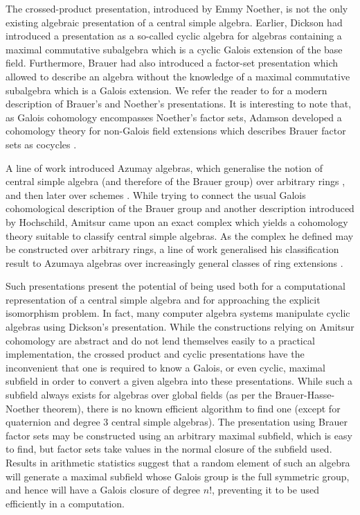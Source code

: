 The crossed-product presentation, introduced by Emmy Noether, is not the only existing algebraic presentation of a central simple algebra. Earlier, Dickson had introduced a presentation as a so-called cyclic algebra for algebras containing a maximal commutative subalgebra which is a cyclic Galois extension of the base field. Furthermore, Brauer had also introduced a factor-set presentation which allowed to describe an algebra without the knowledge of a maximal commutative subalgebra which is a Galois extension. We refer the reader to \cite{jacobson2009finite} for a modern description of Brauer's and Noether's presentations. It is interesting to note that, as Galois cohomology encompasses Noether's factor sets, Adamson developed a cohomology theory for non-Galois field extensions which describes Brauer factor sets as cocycles \cite{adamson1954cohomology}.

A line of work introduced Azumay algebras, which generalise the notion of central simple algebra (and therefore of the Brauer group) over arbitrary rings \cite{azumaya1951maximally,auslander1960brauer}, and then later over schemes \cite{grothendieck1968groupe,grothendieck1968groupe2,grothendieck1966groupe}. While trying to connect the usual Galois cohomological description of the Brauer group and another description introduced by Hochschild, Amitsur came upon an exact complex which yields a cohomology theory suitable to classify central simple algebras. As the complex he defined may be constructed over arbitrary rings, a line of work generalised his classification result to Azumaya algebras over increasingly general classes of ring extensions \cite{amitsur1959simple,rosenberg1960amitsur,chase1965amitsur}.

Such presentations present the potential of being used both for a computational representation of a central simple algebra and for approaching the explicit isomorphism problem. In fact, many computer algebra systems manipulate cyclic algebras using Dickson's presentation. While the constructions relying on Amitsur cohomology are abstract and do not lend themselves easily to a practical implementation, the crossed product and cyclic presentations have the inconvenient that one is required to know a Galois, or even cyclic, maximal subfield in order to convert a given algebra into these presentations. While such a subfield always exists for algebras over global fields (as per the Brauer-Hasse-Noether theorem), there is no known efficient algorithm to find one (except for quaternion and degree 3 central simple algebras). The presentation using Brauer factor sets may be constructed using an arbitrary maximal subfield, which is easy to find, but factor sets take values in the normal closure of the subfield used. Results in arithmetic statistics \cite{eberhard2022characteristic} suggest that a random element of such an algebra will generate a maximal subfield whose Galois group is the full symmetric group, and hence will have a Galois closure of degree \(n!\), preventing it to be used efficiently in a computation.

